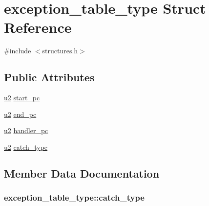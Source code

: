 \hypertarget{structexception__table__type}{}\section{exception\+\_\+table\+\_\+type Struct Reference}
\label{structexception__table__type}


{\ttfamily \#include $<$structures.\+h$>$}

\subsection*{Public Attributes}
\begin{DoxyCompactItemize}
\item 
\hyperlink{structures_8h_a55ef8d87fd202b8417704c089899c5b9}{u2} \hyperlink{structexception__table__type_a71cf8eaa3d06b89818100df6405b266d}{start\+\_\+pc}
\item 
\hyperlink{structures_8h_a55ef8d87fd202b8417704c089899c5b9}{u2} \hyperlink{structexception__table__type_a796565865a227dc76b0dd7c78e3f8424}{end\+\_\+pc}
\item 
\hyperlink{structures_8h_a55ef8d87fd202b8417704c089899c5b9}{u2} \hyperlink{structexception__table__type_af1b56d902850a41f63b7271029946759}{handler\+\_\+pc}
\item 
\hyperlink{structures_8h_a55ef8d87fd202b8417704c089899c5b9}{u2} \hyperlink{structexception__table__type_a663fa7b2d1a468b29913fd92e006a5dc}{catch\+\_\+type}
\end{DoxyCompactItemize}


\subsection{Member Data Documentation}
\subsubsection[{\texorpdfstring{catch\+\_\+type}{catch_type}}]{ exception\+\_\+table\+\_\+type\+::catch\+\_\+type}\hypertarget{structexception__table__type_a663fa7b2d1a468b29913fd92e006a5dc}{}\label{structexception__table__type_a663fa7b2d1a468b29913fd92e006a5dc}
